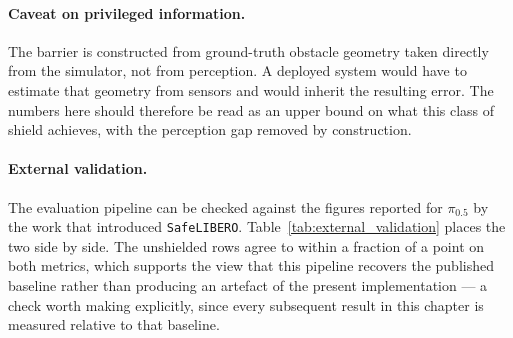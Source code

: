\documentclass[a4paper,11pt]{report}
\begin{document}
\paragraph{Caveat on privileged information.}
The barrier is constructed from ground-truth obstacle geometry taken directly from the simulator,
not from perception. A deployed system would have to estimate that geometry from sensors and would
inherit the resulting error. The numbers here should therefore be read as an upper bound on what
this class of shield achieves, with the perception gap removed by construction.

\paragraph{External validation.}
The evaluation pipeline can be checked against the figures reported for $\pi_{0.5}$ by the work
that introduced \texttt{SafeLIBERO}. Table~\ref{tab:external_validation} places the two side by
side. The unshielded rows agree to within a fraction of a point on both metrics, which supports the
view that this pipeline recovers the published baseline rather than producing an artefact of the
present implementation --- a check worth making explicitly, since every subsequent result in this
chapter is measured relative to that baseline.
\end{document}
